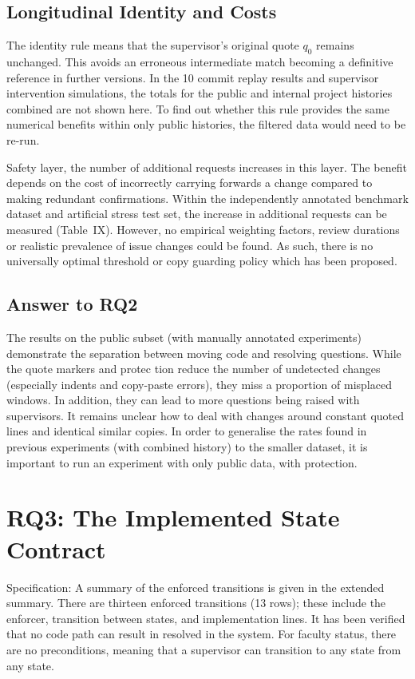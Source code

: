 \documentclass[10pt,conference,letterpaper]{IEEEtran}
\begin{document}
\subsection{Longitudinal Identity and Costs}
The identity rule means that the supervisor’s original quote $q_0$ remains unchanged. This avoids an erroneous intermediate match becoming a definitive reference in further versions. In the 10 commit replay results and supervisor intervention simulations, the totals for the public and internal project histories combined are not shown here. To find out whether this rule provides the same numerical benefits within only public histories, the filtered data would need to be re-run.

Safety layer, the number of additional requests increases in this layer. The benefit depends on the cost of incorrectly carrying forwards a change compared to making redundant confirmations. Within the independently annotated benchmark dataset and artificial stress test set, the increase in additional requests can be measured (Table~IX). However, no empirical weighting factors, review durations or realistic prevalence of issue changes could be found. As such, there is no universally optimal threshold or copy guarding policy which has been proposed.

\subsection{Answer to RQ2}
The results on the public subset (with manually annotated experiments) demonstrate the separation between moving code and resolving questions. While the quote markers and protec tion reduce the number of undetected changes (especially indents and copy-paste errors), they miss a proportion of misplaced windows. In addition, they can lead to more questions being raised with supervisors. It remains unclear how to deal with changes around constant quoted lines and identical similar copies. In order to generalise the rates found in previous experiments (with combined history) to the smaller dataset, it is important to run an experiment with only public data, with protection.

\section{RQ3: The Implemented State Contract}


Specification: A summary of the enforced transitions is given in the extended summary. There are thirteen enforced transitions (13 rows); these include the enforcer, transition between states, and implementation lines. It has been verified that no code path can result in resolved in the system. For faculty status, there are no preconditions, meaning that a supervisor can transition to any state from any state.
\end{document}
